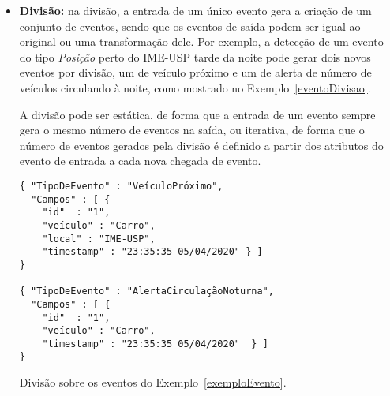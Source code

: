 \begin{itemize}
\item \textbf{Divisão:} na divisão, a entrada de um único evento gera a criação de um conjunto de eventos, sendo que os eventos de saída podem ser igual ao original ou uma transformação dele. Por exemplo, a detecção de um evento do tipo \textit{Posição} perto do IME-USP tarde da noite pode gerar dois novos eventos por divisão, um de veículo próximo e um de alerta de número de veículos circulando à noite, como mostrado no Exemplo~\ref{eventoDivisao}.

A divisão pode ser estática, de forma que a entrada de um evento sempre gera o mesmo número de eventos na saída, ou iterativa, de forma que o número de eventos gerados pela divisão é definido a partir dos atributos do evento de entrada a cada nova chegada de evento. 

\begin{evento}[h]
\begin{verbatim}
{ "TipoDeEvento" : "VeículoPróximo",
  "Campos" : [ {
    "id"  : "1",
    "veículo" : "Carro",
    "local" : "IME-USP",
    "timestamp" : "23:35:35 05/04/2020" } ]
}

{ "TipoDeEvento" : "AlertaCirculaçãoNoturna",
  "Campos" : [ {
    "id"  : "1",
    "veículo" : "Carro",
    "timestamp" : "23:35:35 05/04/2020"  } ]
}
\end{verbatim}
\caption{Divisão sobre os eventos do Exemplo~\ref{exemploEvento}.}
\label{eventoDivisao}
\end{evento}




\end{itemize}
